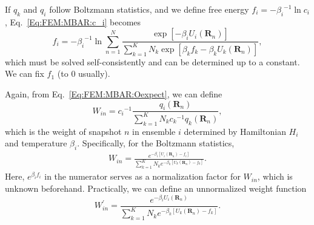 If $q_k$ and $q_i$ follow Boltzmann statistics, and we define free energy $f_i=-{\beta_i}^{-1}\ln{c_i}$, Eq.~\ref{Eq:FEM:MBAR:c_i} becomes
\begin{equation}
    f_i=-{\beta_i}^{-1}\ln{\sum\limits_{n=1}^N \frac{\exp{\left[-\beta_i U_i(\mathbf{R}_n)\right]}}{\sum_{k=1}^{K}N_k\exp{\left[\beta_kf_k-\beta_kU_k(\mathbf{R}_n)\right]}}},
    \label{Eq:FEM:MBAR:f_i_final}
\end{equation}
which must be solved self-consistently and can be determined up to a constant. We can fix $f_1$ (to 0 usually). 

Again, from Eq.~\ref{Eq:FEM:MBAR:Oexpect}, we can define
\begin{equation}
    W_{in}={c_i}^{-1}\frac{q_i(\mathbf{R}_n)}{\sum_{k=1}^{K}N_k{c_k}^{-1}q_k(\mathbf{R}_n)},
\end{equation}
which is the weight of snapshot $n$ in ensemble $i$ determined by Hamiltonian $H_i$ and temperature $\beta_i$. Specifically, for the Boltzmann statistics,
\begin{align}
    W_{in}=\frac{e^{-\beta_i \left[U_i(\mathbf{R}_n)-f_i\right]}}{\sum_{k=1}^{K}N_k e^{-\beta_k \left[U_k(\mathbf{R}_n)-f_k\right]}}.
\end{align}
Here, $e^{\beta_i f_i}$ in the numerator serves as a normalization factor for $W_{in}$, which is unknown beforehand. Practically, we can define an unnormalized weight function
\begin{equation}
	W_{in}^\prime=\frac{e^{-\beta_i U_i(\mathbf{R}_n)}}{\sum_{k=1}^{K}N_k e^{-\beta_k \left[U_k(\mathbf{R}_n)-f_k\right]}}.
\end{equation} 

